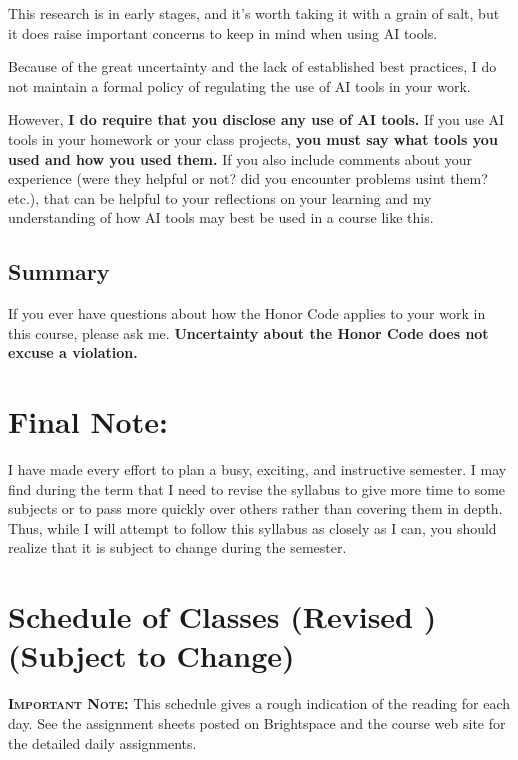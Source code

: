 \documentclass[11pt,twoside]{jgsyllabus}\usepackage[]{graphicx}\usepackage[]{xcolor}
\begin{document}
This research is in early stages, and it's worth taking it with a grain
of salt, but it does raise important concerns to keep in mind when using
AI tools.

Because of the great uncertainty and the lack of established best
practices, I do not maintain a formal policy of regulating the use of
AI tools in your work.

However, \textbf{I do require that you disclose any use of AI tools.}
If you use
AI tools in your homework or your class projects,
\textbf{you must say what tools you used and how you used them.}
If you also include comments about
your experience (were they helpful or not? did you encounter problems
usint them? etc.), that can be helpful to your reflections on your
learning and my understanding of how AI tools may best be used in a
course like this.

\subsection{Summary}

If you ever
have questions about how the Honor Code applies to your work
in this course, please ask me.
\textbf{Uncertainty about the Honor Code does not excuse a violation.}
\section{Final Note:}
I have made every effort to plan a busy, exciting, and instructive semester.
I may find during the term that I need to revise the syllabus to give more time
to some subjects or to pass more quickly over others rather than covering them
in depth.
Thus, while I will attempt to follow this syllabus as closely as I can,
you should realize that it is subject to change during the semester.
%
%
\iftrue

\fi
%
%
%
%
%
%
%

\cleardoublepage
\clearpage
\appendix
\setcounter{secnumdepth}{0}
\newcommand{\maybehline}{\hline}%
\setlength\extrarowheight{4pt}
\section[Class Schedule]{Schedule of Classes
\ifrevised
	(Revised \RevisionDate)%
\else
	(Subject to Change)%
\fi}

\textbf{\scshape Important Note:} This schedule gives a rough indication of the
reading for each day. See the assignment sheets posted on Brightspace
and the course web site for the detailed daily assignments.
\end{document}
